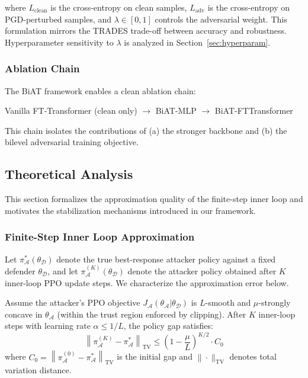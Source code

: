 where $L_{\text{clean}}$ is the cross-entropy on clean samples, $L_{\text{adv}}$ is the cross-entropy on PGD-perturbed samples, and $\lambda \in [0,1]$ controls the adversarial weight. This formulation mirrors the TRADES \cite{zhang2019trades} trade-off between accuracy and robustness. Hyperparameter sensitivity to $\lambda$ is analyzed in Section~\ref{sec:hyperparam}.

\subsubsection{Ablation Chain}
The BiAT framework enables a clean ablation chain:
\begin{center}
    Vanilla FT-Transformer (clean only) $\to$ BiAT-MLP $\to$ BiAT-FTTransformer
\end{center}
This chain isolates the contributions of (a) the stronger backbone and (b) the bilevel adversarial training objective.

\subsection{Theoretical Analysis}
\label{sec:theory}

This section formalizes the approximation quality of the finite-step inner loop and motivates the stabilization mechanisms introduced in our framework.

\subsubsection{Finite-Step Inner Loop Approximation}

Let $\pi_{\mathcal{A}}^*(\theta_{\mathcal{D}})$ denote the true best-response attacker policy against a fixed defender $\theta_{\mathcal{D}}$, and let $\pi_{\mathcal{A}}^{(K)}(\theta_{\mathcal{D}})$ denote the attacker policy obtained after $K$ inner-loop PPO update steps. We characterize the approximation error below.

\begin{proposition}
\label{prop:inner_approx}
Assume the attacker's PPO objective $J_{\mathcal{A}}(\theta_{\mathcal{A}} | \theta_{\mathcal{D}})$ is $L$-smooth and $\mu$-strongly concave in $\theta_{\mathcal{A}}$ (within the trust region enforced by clipping). After $K$ inner-loop steps with learning rate $\alpha \leq 1/L$, the policy gap satisfies:
\begin{equation}
    \left\| \pi_{\mathcal{A}}^{(K)} - \pi_{\mathcal{A}}^* \right\|_{\mathrm{TV}} \leq \left(1 - \frac{\mu}{L}\right)^{K/2} \cdot C_0
    \label{eq:inner_bound}
\end{equation}
where $C_0 = \left\| \pi_{\mathcal{A}}^{(0)} - \pi_{\mathcal{A}}^* \right\|_{\mathrm{TV}}$ is the initial gap and $\|\cdot\|_{\mathrm{TV}}$ denotes total variation distance.
\end{proposition}

